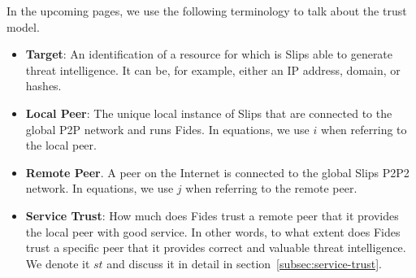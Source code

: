 \vspace{1cm}

\noindent
In the upcoming pages, we use the following terminology to talk about the trust model.

\begin{itemize}

\item \textbf{Target}: An identification of a resource for which is Slips able to generate threat intelligence. It can be, for example, either an IP address, domain, or hashes.

\item \textbf{Local Peer}: The unique local instance of Slips that are connected to the global P2P network and runs Fides. In equations, we use $i$ when referring to the local peer.

\item \textbf{Remote Peer}. A peer on the Internet is connected to the global Slips P2P2 network. In equations, we use $j$ when referring to the remote peer.

\item \textbf{Service Trust}: How much does Fides trust a remote peer that it provides the local peer with good service. In other words, to what extent does Fides trust a specific peer that it provides correct and valuable threat intelligence. We denote it $st$ and discuss it in detail in section~\ref{subsec:service-trust}.

\end{itemize}











